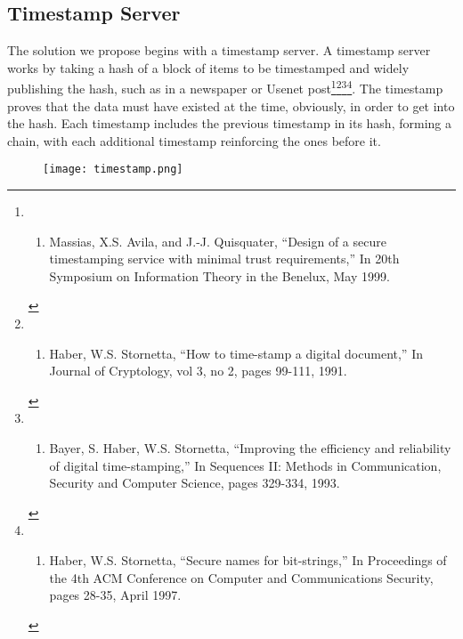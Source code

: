 \subsection{Timestamp Server}\label{timestamp-server}

The solution we propose begins with a timestamp server. A timestamp
server works by taking a hash of a block of items to be timestamped and
widely publishing the hash, such as in a newspaper or Usenet
post\footnote{\begin{enumerate}
  \def\labelenumi{\Alph{enumi}.}
  \setcounter{enumi}{7}
  \tightlist
  \item
    Massias, X.S. Avila, and J.-J. Quisquater, ``Design of a secure
    timestamping service with minimal trust requirements,'' In 20th
    Symposium on Information Theory in the Benelux, May 1999.
  \end{enumerate}}\footnote{\begin{enumerate}
  \def\labelenumi{\Alph{enumi}.}
  \setcounter{enumi}{18}
  \tightlist
  \item
    Haber, W.S. Stornetta, ``How to time-stamp a digital document,'' In
    Journal of Cryptology, vol 3, no 2, pages 99-111, 1991.
  \end{enumerate}}\footnote{\begin{enumerate}
  \def\labelenumi{\Alph{enumi}.}
  \setcounter{enumi}{3}
  \tightlist
  \item
    Bayer, S. Haber, W.S. Stornetta, ``Improving the efficiency and
    reliability of digital time-stamping,'' In Sequences II: Methods in
    Communication, Security and Computer Science, pages 329-334, 1993.
  \end{enumerate}}\footnote{\begin{enumerate}
  \def\labelenumi{\Alph{enumi}.}
  \setcounter{enumi}{18}
  \tightlist
  \item
    Haber, W.S. Stornetta, ``Secure names for bit-strings,'' In
    Proceedings of the 4th ACM Conference on Computer and Communications
    Security, pages 28-35, April 1997.
  \end{enumerate}}. The timestamp proves that the data must have existed
at the time, obviously, in order to get into the hash. Each timestamp
includes the previous timestamp in its hash, forming a chain, with each
additional timestamp reinforcing the ones before it.

\begin{figure}
\centering
\texttt{[image: timestamp.png]}
\caption{}
\end{figure}

